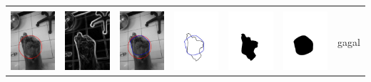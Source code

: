 \begin{table}[H]
\begin{tabular}{|m{0.7in}|m{0.7in}|m{0.7in}|m{0.7in}|m{0.7in}|m{0.7in}|m{0.7in}|}
		&  &  & & & &  \\
		\includegraphics[width=0.7in]{dataset/dataset_3/luka_merah/ready/4_interp_init.jpg}&
		\includegraphics[width=0.7in]{dataset/dataset_3/luka_merah/ready/4_interp_ext.jpg}&
		\includegraphics[width=0.7in]{dataset/dataset_3/luka_merah/ready/4_interp_result.jpg}&
		\includegraphics[width=0.7in]{dataset/dataset_3/luka_merah/ready/4_gt_r.jpg}&
		\includegraphics[width=0.7in]{dataset/dataset_3/luka_merah/ready/4_r.jpg}&
		\includegraphics[width=0.7in]{dataset/dataset_3/luka_merah/ready/4_interp_r.jpg}&
		gagal\\
		\hline
		

\end{tabular}
\end{table}
